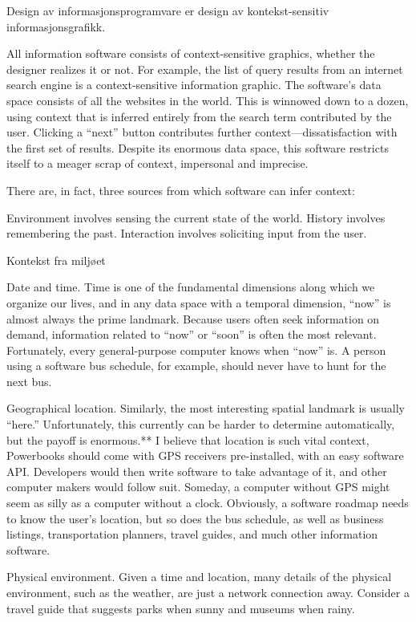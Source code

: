 {Design av informasjonsprogramvare er design av kontekst-sensitiv informasjonsgrafikk.

All information software consists of context-sensitive graphics, whether the designer realizes it or not. For example, the list of query results from an internet search engine is a context-sensitive information graphic. The software’s data space consists of all the websites in the world. This is winnowed down to a dozen, using context that is inferred entirely from the search term contributed by the user. Clicking a “next” button contributes further context—dissatisfaction with the first set of results. Despite its enormous data space, this software restricts itself to a meager scrap of context, impersonal and imprecise.

There are, in fact, three sources from which software can infer context:

    Environment involves sensing the current state of the world.
    History involves remembering the past.
    Interaction involves soliciting input from the user.

Kontekst fra miljøet

Date and time. Time is one of the fundamental dimensions along which we organize our lives, and in any data space with a temporal dimension, “now” is almost always the prime landmark. Because users often seek information on demand, information related to “now” or “soon” is often the most relevant. Fortunately, every general-purpose computer knows when “now” is. A person using a software bus schedule, for example, should never have to hunt for the next bus.

Geographical location. Similarly, the most interesting spatial landmark is usually “here.” Unfortunately, this currently can be harder to determine automatically, but the payoff is enormous.** I believe that location is such vital context, Powerbooks should come with GPS receivers pre-installed, with an easy software API. Developers would then write software to take advantage of it, and other computer makers would follow suit. Someday, a computer without GPS might seem as silly as a computer without a clock. Obviously, a software roadmap needs to know the user’s location, but so does the bus schedule, as well as business listings, transportation planners, travel guides, and much other information software.

Physical environment. Given a time and location, many details of the physical environment, such as the weather, are just a network connection away. Consider a travel guide that suggests parks when sunny and museums when rainy.

}
